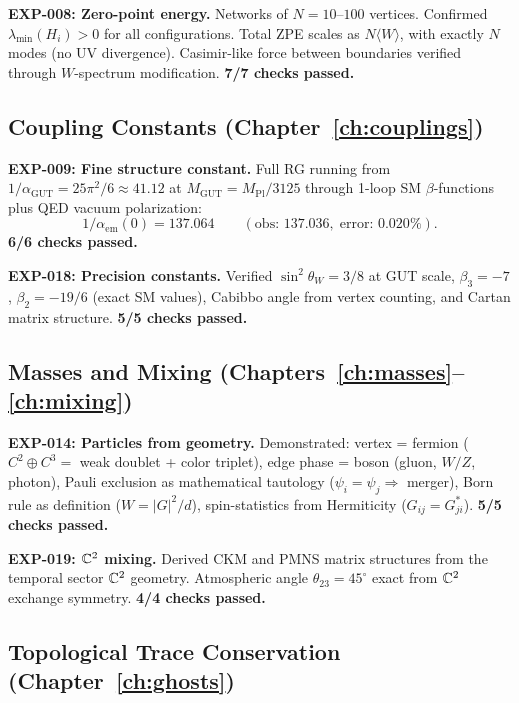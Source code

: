 \textbf{EXP-008: Zero-point energy.} Networks of $N = 10$--$100$ vertices. Confirmed $\lambda_\text{min}(H_i) > 0$ for all configurations. Total ZPE scales as $N\langle W\rangle$, with exactly $N$ modes (no UV divergence). Casimir-like force between boundaries verified through $W$-spectrum modification. \textbf{7/7 checks passed.}

\subsection{Coupling Constants (Chapter~\ref{ch:couplings})}

\textbf{EXP-009: Fine structure constant.} Full RG running from $1/\alpha_\text{GUT} = 25\pi^2/6 \approx 41.12$ at $M_\text{GUT} = M_\text{Pl}/3125$ through 1-loop SM $\beta$-functions plus QED vacuum polarization:
\begin{equation}
1/\alpha_\text{em}(0) = 137.064 \qquad (\text{obs: } 137.036,\;\text{error: } 0.020\%).
\end{equation}
\textbf{6/6 checks passed.}

\textbf{EXP-018: Precision constants.} Verified $\sin^2\theta_W = 3/8$ at GUT scale, $\beta_3 = -7$, $\beta_2 = -19/6$ (exact SM values), Cabibbo angle from vertex counting, and Cartan matrix structure. \textbf{5/5 checks passed.}

\subsection{Masses and Mixing (Chapters~\ref{ch:masses}--\ref{ch:mixing})}

\textbf{EXP-014: Particles from geometry.} Demonstrated: vertex = fermion ($C^2 \oplus C^3 =$ weak doublet + color triplet), edge phase = boson (gluon, $W/Z$, photon), Pauli exclusion as mathematical tautology ($\psi_i = \psi_j \Rightarrow$ merger), Born rule as definition ($W = |G|^2/d$), spin-statistics from Hermiticity ($G_{ij} = G_{ji}^*$). \textbf{5/5 checks passed.}

\textbf{EXP-019: $\mathbb{C}^2$ mixing.} Derived CKM and PMNS matrix structures from the temporal sector $\mathbb{C}^2$ geometry. Atmospheric angle $\theta_{23} = 45^\circ$ exact from $\mathbb{C}^2$ exchange symmetry. \textbf{4/4 checks passed.}

\subsection{Topological Trace Conservation (Chapter~\ref{ch:ghosts})}


